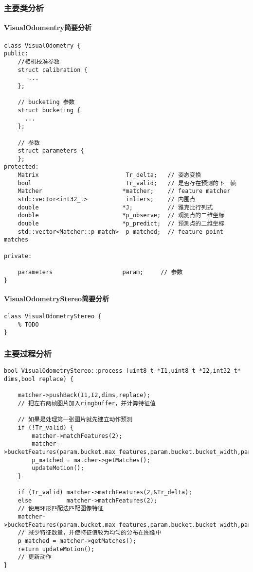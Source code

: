 \documentclass[UTF8]{ctexart}
\begin{document}
    \subsubsection{主要类分析}
    \paragraph{VisualOdomentry简要分析}
    \begin{verbatim}
class VisualOdometry {
public:
    //相机校准参数
    struct calibration {  
       ...
    };
  
    // bucketing 参数
    struct bucketing {  
      ...
    };
  
    // 参数
    struct parameters {
    };
protected:
    Matrix                         Tr_delta;   // 姿态变换
    bool                           Tr_valid;   // 是否存在预测的下一帧
    Matcher                       *matcher;    // feature matcher
    std::vector<int32_t>           inliers;    // 内围点
    double                        *J;          // 雅克比行列式
    double                        *p_observe;  // 观测点的二维坐标
    double                        *p_predict;  // 预测点的二维坐标
    std::vector<Matcher::p_match>  p_matched;  // feature point matches
    
private:
    
    parameters                    param;     // 参数
}
    \end{verbatim}
    \paragraph{VisualOdometryStereo简要分析}
    \begin{verbatim}
class VisualOdometryStereo {
    % TODO
}
    \end{verbatim}
    \subsubsection{主要过程分析}
    \begin{verbatim}
bool VisualOdometryStereo::process (uint8_t *I1,uint8_t *I2,int32_t* dims,bool replace) {

    matcher->pushBack(I1,I2,dims,replace);
    // 把左右两帧图片加入ringbuffer，并计算特征值
    
    // 如果是处理第一张图片就先建立动作预测
    if (!Tr_valid) {
        matcher->matchFeatures(2);
        matcher->bucketFeatures(param.bucket.max_features,param.bucket.bucket_width,param.bucket.bucket_height);                          
        p_matched = matcher->getMatches();
        updateMotion();
    }
    
    if (Tr_valid) matcher->matchFeatures(2,&Tr_delta);
    else          matcher->matchFeatures(2);
    // 使用环形匹配法匹配图像特征
    matcher->bucketFeatures(param.bucket.max_features,param.bucket.bucket_width,param.bucket.bucket_height);                          
    // 减少特征数量，并使特征值较为均匀的分布在图像中
    p_matched = matcher->getMatches();
    return updateMotion();
    // 更新动作
}
        
    \end{verbatim}
\end{document}
